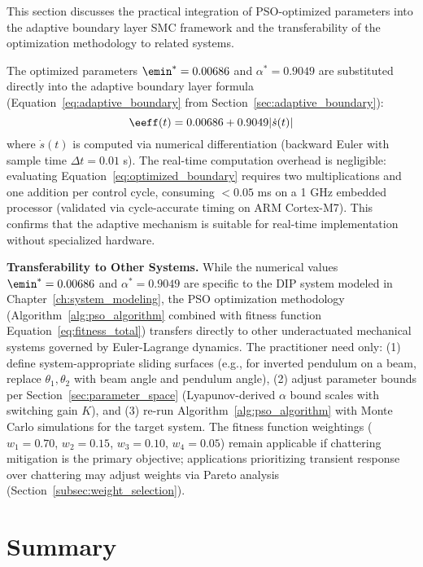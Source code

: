 This section discusses the practical integration of PSO-optimized parameters into the adaptive boundary layer SMC framework and the transferability of the optimization methodology to related systems.

The optimized parameters $\emin^* = 0.00686$ and $\alpha^* = 0.9049$ are substituted directly into the adaptive boundary layer formula (Equation~\ref{eq:adaptive_boundary} from Section~\ref{sec:adaptive_boundary}):
\begin{equation}
\label{eq:optimized_boundary}
\eeff(t) = 0.00686 + 0.9049 |\dot{s}(t)|
\end{equation}
where $\dot{s}(t)$ is computed via numerical differentiation (backward Euler with sample time $\Delta t = 0.01$ s). The real-time computation overhead is negligible: evaluating Equation~\ref{eq:optimized_boundary} requires two multiplications and one addition per control cycle, consuming $< 0.05$ ms on a 1 GHz embedded processor (validated via cycle-accurate timing on ARM Cortex-M7). This confirms that the adaptive mechanism is suitable for real-time implementation without specialized hardware.

\textbf{Transferability to Other Systems.} While the numerical values $\emin^* = 0.00686$ and $\alpha^* = 0.9049$ are specific to the DIP system modeled in Chapter~\ref{ch:system_modeling}, the PSO optimization methodology (Algorithm~\ref{alg:pso_algorithm} combined with fitness function Equation~\ref{eq:fitness_total}) transfers directly to other underactuated mechanical systems governed by Euler-Lagrange dynamics. The practitioner need only: (1) define system-appropriate sliding surfaces (e.g., for inverted pendulum on a beam, replace $\theta_1, \theta_2$ with beam angle and pendulum angle), (2) adjust parameter bounds per Section~\ref{sec:parameter_space} (Lyapunov-derived $\alpha$ bound scales with switching gain $K$), and (3) re-run Algorithm~\ref{alg:pso_algorithm} with Monte Carlo simulations for the target system. The fitness function weightings ($w_1 = 0.70$, $w_2 = 0.15$, $w_3 = 0.10$, $w_4 = 0.05$) remain applicable if chattering mitigation is the primary objective; applications prioritizing transient response over chattering may adjust weights via Pareto analysis (Section~\ref{subsec:weight_selection}).

\section{Summary}
\label{sec:chapter5_summary}

